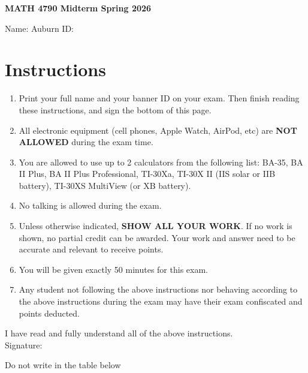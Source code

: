 \documentclass[12pt]{article}
\begin{document}
\begin{center}
    \Large \textbf{MATH 4790 Midterm Spring 2026} \\[1em]
\end{center}

\vspace{.25cm}

\noindent Name: \underline{\hspace{8cm}} \hspace{.25cm} Auburn ID: \underline{\hspace{4cm}}



\section*{Instructions}
\begin{enumerate}[label=\arabic*.]
\item Print your full name and your banner ID on your exam. Then finish reading these instructions, and sign the bottom of this page.
\item All electronic equipment (cell phones, Apple Watch, AirPod, etc) are \textbf{NOT ALLOWED} during the exam time.
\item You are allowed to use up to 2 calculators from the following list: BA-35, BA II Plus, BA II Plus Professional, TI-30Xa, TI-30X II (IIS solar or IIB battery), TI-30XS MultiView (or XB battery).
\item No talking is allowed during the exam.
\item Unless otherwise indicated, \textbf{SHOW ALL YOUR WORK}. If no work is shown, no partial credit can be awarded. Your work and answer need to be accurate and relevant to receive points.
\item You will be given exactly 50 minutes for this exam.
\item Any student not following the above instructions nor behaving according to the above instructions during the exam may have their exam confiscated and points deducted.
\end{enumerate}

I have read and fully understand all of the above instructions. \\[2em]
Signature: \hrulefill


\vspace{.75cm}
Do not write in the table below
\end{document}
